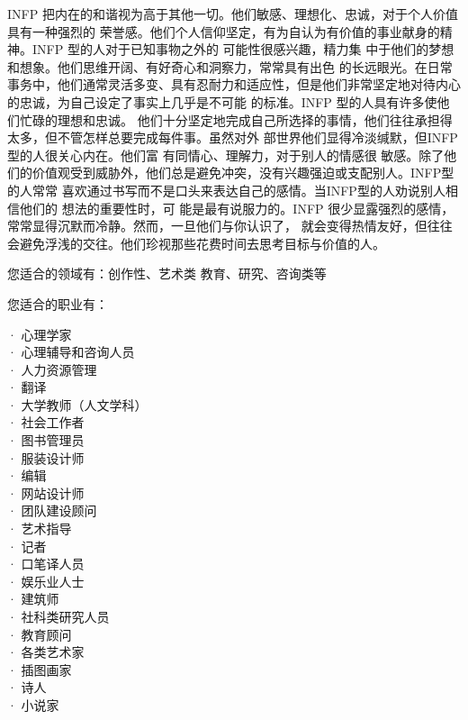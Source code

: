 		INFP 把内在的和谐视为高于其他一切。他们敏感、理想化、忠诚，对于个人价值具有一种强烈的
	荣誉感。他们个人信仰坚定，有为自认为有价值的事业献身的精神。INFP 型的人对于已知事物之外的
	可能性很感兴趣，精力集 中于他们的梦想和想象。他们思维开阔、有好奇心和洞察力，常常具有出色
	的长远眼光。在日常事务中，他们通常灵活多变、具有忍耐力和适应性，但是他们非常坚定地对待内心
	的忠诚，为自己设定了事实上几乎是不可能 的标准。INFP 型的人具有许多使他们忙碌的理想和忠诚。
	他们十分坚定地完成自己所选择的事情，他们往往承担得太多，但不管怎样总要完成每件事。虽然对外
	部世界他们显得冷淡缄默，但INFP型的人很关心内在。他们富 有同情心、理解力，对于别人的情感很
	敏感。除了他们的价值观受到威胁外，他们总是避免冲突，没有兴趣强迫或支配别人。INFP型的人常常
	喜欢通过书写而不是口头来表达自己的感情。当INFP型的人劝说别人相信他们的 想法的重要性时，可
	能是最有说服力的。INFP 很少显露强烈的感情，常常显得沉默而冷静。然而，一旦他们与你认识了，
	就会变得热情友好，但往往会避免浮浅的交往。他们珍视那些花费时间去思考目标与价值的人。

		您适合的领域有：创作性、艺术类 教育、研究、咨询类等

		您适合的职业有：

	\begin{multicols}{2}
		\indentenv{4\ccwd}{0\ccwd}{\hspace{-1ex}}
		· 心理学家 \\
		· 心理辅导和咨询人员 \\
		· 人力资源管理 \\
		· 翻译 \\
		· 大学教师（人文学科） \\
		· 社会工作者 \\
		· 图书管理员 \\
		· 服装设计师 \\
		· 编辑 \\
		· 网站设计师 \\
		· 团队建设顾问 \\
		· 艺术指导 \\
		· 记者 \\
		· 口笔译人员 \\
		· 娱乐业人士 \\
		· 建筑师 \\
		· 社科类研究人员 \\
		· 教育顾问 \\
		· 各类艺术家 \\
		· 插图画家 \\
		· 诗人 \\
		· 小说家
		\endindentenv
	\end{multicols}

